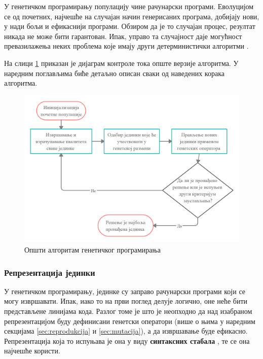 \documentclass[a4paper]{article}
\begin{document}
У генетичком програмирању популацију чине рачунарски програми. Еволуцијом се од почетних, најчешће на случајан начин генерисаних програма, добијају нови, у нади бољи и ефикаснији програми. Обзиром да је то случајан процес, резултат никада не може бити гарантован. Ипак, управо та случајност даје могућност превазилажења неких проблема које имају други детерминистички алгоритми \cite{fieldGuidetoGP}. 

На слици \ref{fig:kontrola_toka} приказан је дијаграм контроле тока опште верзије алгоритма. У наредним поглављима биће детаљно описан сваки од наведених корака алгоритма.

\begin{figure}[h!]
    \begin{center}
        \includegraphics[scale=0.22]{opstiAlgoritam.png}
    \end{center}
    \caption{Општи алгоритам генетичког програмирања}
    \label{fig:kontrola_toka}
\end{figure}

\subsubsection{Репрезентација јединки}

У генетичком програмирању, јединке су заправо рачунарски програми који се могу извршавати. Ипак, иако то на први поглед делује логично, оне неће бити представљене линијама кода. Разлог томе је што је неопходно да над изабраном репрезентацијом буду дефинисани генетски оператори (више о њима у наредним секцијама \ref{sec:reprodukcija} и \ref{sec:mutacija}), а да извршавање буде ефикасно. Репрезентација која то испуњава је она у виду \textbf{синтаксних стабала} \cite{synTrees}, те се она најчешће користи.\newline
\end{document}
